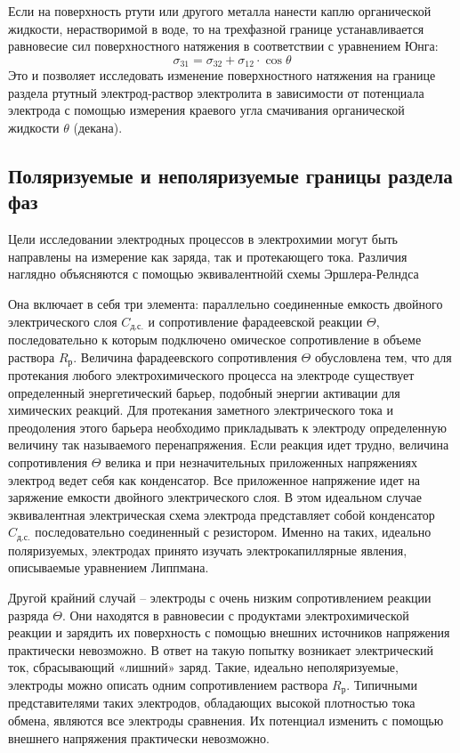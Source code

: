 \documentclass[a4paper, 12pt]{article}
\begin{document}
Если на поверхность ртути или другого металла нанести каплю органической
жидкости, нерастворимой в воде, то на трехфазной границе устанавливается
равновесие сил поверхностного натяжения в соответствии с уравнением Юнга:
\begin{equation}\label{sigma}
\sigma_{31}=\sigma_{32}+\sigma_{12}\cdot\cos{\theta}
\end{equation}
Это и позволяет исследовать изменение поверхностного натяжения на границе
раздела ртутный электрод-раствор электролита в зависимости от потенциала
электрода с помощью измерения краевого угла смачивания органической жидкости
$\theta$ (декана).

\subsection*{Поляризуемые и неполяризуемые границы раздела фаз}
Цели исследовании электродных процессов в электрохимии могут быть направлены на измерение как заряда, так и протекающего тока. Различия наглядно объясняются с помощью эквивалентнойй схемы Эршлера-Релндса

Она включает в себя три элемента: параллельно соединенные емкость двойного электрического слоя $C_\text{д.с.}$ и сопротивление фарадеевской реакции $\Theta$, последовательно к которым подключено омическое сопротивление в объеме раствора $R_\text{р}$. Величина фарадеевского сопротивления $\Theta$ обусловлена тем, что для протекания любого электрохимического процесса на электроде существует определенный энергетический барьер, подобный энергии активации для химических реакций. Для протекания заметного электрического тока и преодоления этого барьера необходимо прикладывать к электроду определенную величину так называемого перенапряжения. Если реакция идет трудно, величина сопротивления $\Theta$ велика и при незначительных приложенных напряжениях электрод ведет себя как конденсатор. Все приложенное напряжение идет на заряжение емкости двойного электрического слоя. В этом идеальном случае эквивалентная электрическая схема электрода представляет собой конденсатор $C_\text{д.с.}$ последовательно соединенный с резистором. Именно на таких, идеально поляризуемых, электродах принято изучать электрокапиллярные явления, описываемые уравнением Липпмана.

Другой крайний случай – электроды с очень низким сопротивлением реакции разряда $\Theta$. Они находятся в равновесии с продуктами электрохимической реакции и зарядить их поверхность с помощью внешних источников напряжения практически невозможно. В ответ на такую попытку возникает электрический ток, сбрасывающий «лишний» заряд. Такие, идеально неполяризуемые, электроды можно описать одним сопротивлением раствора $R_\text{р}$. Типичными представителями таких электродов, обладающих высокой плотностью тока обмена, являются все электроды сравнения. Их потенциал изменить с помощью внешнего напряжения практически невозможно.
\end{document}

